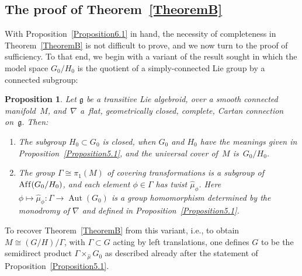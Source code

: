 \documentclass[pdftex]{sigma}
\DeclareMathOperator{\affine}{Af\/f}
\DeclareMathOperator{\automorphism}{Aut}
\numberwithin{equation}{section}
\newtheorem{PropositionBlaom}[TheoremBlaom]{Proposition}
 { \theoremstyle{definition}
\newtheorem{CounterexampleBlaom}[TheoremBlaom]{Counterexample}
\newtheorem{RemarkBlaom}[TheoremBlaom]{Remark} }
\begin{document}
\subsection{The proof of Theorem~\ref{TheoremB}}\label{completetheorem}

With Proposition~\ref{Proposition6.1} in hand, the necessity of
completeness in Theorem~\ref{TheoremB} is not dif\/f\/icult to prove, and we now turn
to the proof of suf\/f\/iciency. To that end, we begin with a variant of
the result sought in which the model space $G_0/H_0$ is the quotient
of a simply-connected Lie group by a connected subgroup:
%
\begin{PropositionBlaom}\label{Proposition6.5}
  Let $\mathfrak g$ be a transitive Lie algebroid, over a smooth
  connected manifold~$M$, and~$\nabla $ a~flat, geometrically closed,
  complete, Cartan connection on~$\mathfrak g$. Then:
  \begin{enumerate}\itemsep=0pt
  \item[$(1)$]%
  The subgroup $H_0 \subset G_0$ is closed, when $G_0$ and $H_0$ have the meanings given in Proposition~{\rm \ref{Proposition5.1}}, and the universal cover of~$M$ is~$G_0/H_0$.

  \item[$(2)$] %
  The group $\Gamma \cong \pi_1(M)$ of covering
    transformations is a subgroup of $\affine({G_0/H_0})$, and each
    element $\phi \in \Gamma $ has twist $\hat \mu_\phi$. Here $\phi
    \mapsto \hat \mu_\phi \colon \Gamma \rightarrow
    \automorphism(G_0)$ is a group homomorphism determined by the
    monodromy of $\nabla $ and defined in Proposition~{\rm \ref{Proposition5.1}}.
  \end{enumerate}
\end{PropositionBlaom}

To recover Theorem~\ref{TheoremB} from this variant, i.e., to obtain $M \cong
(G/H)/\Gamma $, with $\Gamma \subset G$ acting by left translations,
one def\/ines $G$ to be the semidirect product $\Gamma \times_{\hat \mu}
G_0 $ as described already after the statement of Proposition~\ref{Proposition5.1}.
\end{document}
